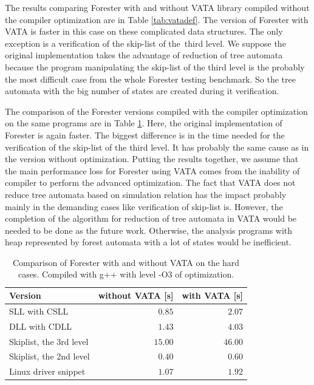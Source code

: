 The results comparing Forester with and without VATA library compiled
without the compiler optimization are in Table \ref{tab:vatadef}.
The version of Forester with VATA is faster in this case
on these complicated data structures.
The only exception is a verification of the skip-list of the~third
level.
We suppose the original implementation takes the advantage of
reduction of tree automata because the program manipulating the skip-list
of the third level is the probably the most difficult case from the whole
Forester testing benchmark.
So the tree automata with the big number of states
are created during it verification.

The comparison of the Forester versions compiled with the compiler optimization
on the same programs are in Table \ref{tab:vataopt}.
Here, the original implementation of Forester is again faster.
The biggest difference is in the time needed for the verification of the skip-list of the third level.
It has probably the same cause as in the version without optimization.
Putting the results together, we assume that the main performance
loss for Forester using VATA comes from the inability of compiler
to perform the advanced optimization.
The fact that VATA does not reduce tree automata based on simulation relation
has the impact probably mainly in the demanding cases like verification of skip-list is.
However, the completion of the algorithm for reduction of tree automata in VATA would be
needed to be done as the future work.
Otherwise, the analysis programs with heap represented by forest automata
with a lot of states would be inefficient.

\begin{table}[bt]
	\vskip6pt
	\caption{Comparison of Forester with and without VATA on the hard cases.
		Compiled with g++ with level -O3 of optimization.
	}
	\centering
	\begin{tabular}{|l | r | r |}
		\hline
		Version & without VATA [s] & with VATA [s] \\
		\hline
		\hline
		SLL with CSLL            & $0.85$ & $2.07$  \\
		\hline
		DLL with CDLL            & $1.43$ & $4.03$ \\
		\hline
		Skiplist, the 3rd level  & $15.00$ & $46.00$ \\
		\hline
		Skiplist, the 2nd level  & $0.40$ & $0.60$  \\
		\hline
		Linux driver snippet     & $1.07$ & $1.92$  \\ 
		\hline
	\end{tabular}
	\label{tab:vataopt}
\end{table}

